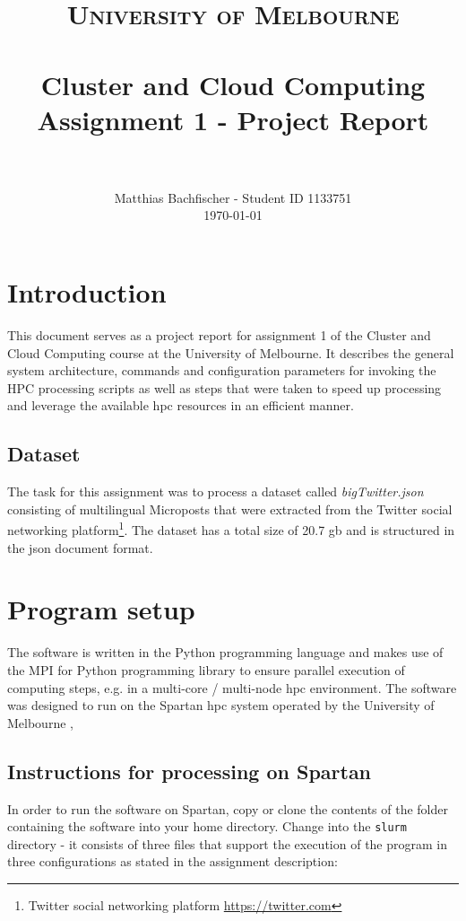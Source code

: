\documentclass[paper=a4, fontsize=11pt]{scrartcl}
\title{
		\usefont{OT1}{bch}{b}{n}
		\normalfont \normalsize \textsc{University of Melbourne} \\ [25pt]
		\horrule{0.5pt} \\[0.4cm]
		\huge Cluster and Cloud Computing Assignment 1 - Project Report \\
		\horrule{2pt} \\[0.5cm]
}
\author{
		\normalfont 								\normalsize
        Matthias Bachfischer - Student ID 1133751\\[-3pt]		\normalsize
        \today
}
\date{}
\numberwithin{equation}{section}		%
\numberwithin{figure}{section}			%
\numberwithin{table}{section}				%
\begin{document}
\maketitle
\section{Introduction}

This document serves as a project report for assignment 1 of the Cluster and Cloud Computing course at the University of Melbourne. It describes the general system architecture, commands and configuration parameters for invoking the HPC processing scripts as well as steps that were taken to speed up processing and leverage the available \acrfull{hpc} resources in an efficient manner.

\subsection{Dataset}
The task for this assignment was to process a dataset called \emph{bigTwitter.json} consisting of multilingual Microposts that were extracted from the Twitter social networking platform\footnote{Twitter social networking platform \url{https://twitter.com}}. The dataset has a total size of 20.7 \acrfull{gb} and is structured in the \acrfull{json} document format.


\section{Program setup}
The software is written in the Python programming language and makes use of the MPI for Python programming library \cite{RN310} to ensure parallel execution of computing steps, e.g. in a multi-core / multi-node \acrshort{hpc} environment. The software was designed to run on the Spartan \acrshort{hpc} system operated by the University of Melbourne \citep{RN309},

\subsection{Instructions for processing on Spartan}
In order to run the software on Spartan, copy or clone the contents of the folder containing the software into your home directory. Change into the \texttt{slurm} directory - it consists of three files that support the execution of the program in three configurations as stated in the assignment description:
\begin{table}[h]
\tiny
{}
\end{table}
\end{document}
